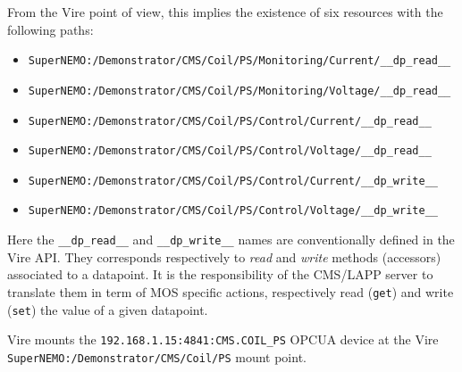 \noindent From the Vire point of view, this implies the existence of six resources with the following paths:
\begin{itemize}
\item \verb|SuperNEMO:/Demonstrator/CMS/Coil/PS/Monitoring/Current/__dp_read__|
\item \verb|SuperNEMO:/Demonstrator/CMS/Coil/PS/Monitoring/Voltage/__dp_read__|
\item \verb|SuperNEMO:/Demonstrator/CMS/Coil/PS/Control/Current/__dp_read__|
\item \verb|SuperNEMO:/Demonstrator/CMS/Coil/PS/Control/Voltage/__dp_read__|
\item \verb|SuperNEMO:/Demonstrator/CMS/Coil/PS/Control/Current/__dp_write__|
\item \verb|SuperNEMO:/Demonstrator/CMS/Coil/PS/Control/Voltage/__dp_write__|
\end{itemize}

Here   the  \verb|__dp_read__|   and  \verb|__dp_write__|   names  are
conventionally defined in the Vire API.  They corresponds respectively
to \emph{read}  and \emph{write}  methods (accessors) associated  to a
datapoint.   It  is  the  responsibility of  the  CMS/LAPP  server  to
translate  them in  term of  MOS specific  actions, respectively  read
(\texttt{get})  and   write  (\texttt{set})  the  value   of  a  given
datapoint.

Vire mounts  the \texttt{192.168.1.15:4841:CMS.COIL\_PS}  OPCUA device
at  the  Vire   \\  \verb|SuperNEMO:/Demonstrator/CMS/Coil/PS|  mount
point.
